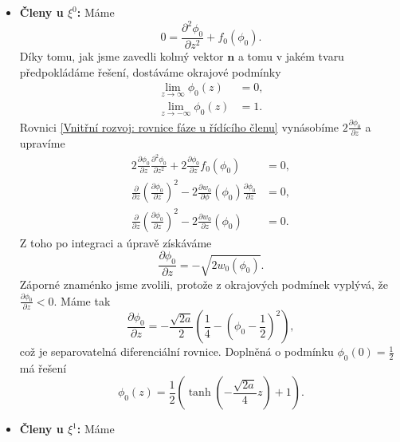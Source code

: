 \begin{itemize}
    \item \textbf{Členy u \(\xi^0\):} Máme
    \begin{equation}\label{Vnitřní rozvoj: rovnice fáze u řídícího členu}
        0 = \frac{\partial^2 \phi_0}{\partial z^2} + f_0(\phi_0).
    \end{equation}
    Díky tomu, jak jsme zavedli kolmý vektor \(\mathbf{n}\) a tomu v jakém tvaru předpokládáme řešení, dostáváme okrajové podmínky
    \begin{align}
        \lim_{z\to \infty} \phi_0(z) &= 0,\\
        \lim_{z \to -\infty} \phi_0(z) &= 1.
    \end{align}
    Rovnici \eqref{Vnitřní rozvoj: rovnice fáze u řídícího členu} vynásobíme \(2 \tfrac{\partial \phi_0}{\partial z}\) a upravíme
    \begin{align}
        2 \frac{\partial \phi_0}{\partial z} \frac{\partial^2 \phi_0}{\partial z^2} + 2 \frac{\partial \phi_0}{\partial z} f_0(\phi_0) &= 0,\\
        \frac{\partial }{\partial z}\left(\frac{\partial \phi_0}{\partial z} \right)^2 - 2\frac{\partial w_0}{\partial \phi}(\phi_0)\frac{\partial \phi_0}{\partial z} &= 0,\\
        \frac{\partial }{\partial z}\left(\frac{\partial \phi_0}{\partial z} \right)^2 - 2\frac{\partial w_0}{\partial z}(\phi_0) &= 0.
    \end{align}
    Z toho po integraci a úpravě získáváme
    \begin{equation}\label{Vnitřní rozvoj: derivace phi_0 podle z}
       \frac{\partial \phi_0}{\partial z} = - \sqrt{2w_0(\phi_0)}.
    \end{equation}
    Záporné znaménko jsme zvolili, protože z okrajových podmínek vyplývá, že \(\tfrac{\partial \phi_0}{\partial z} < 0\).
    Máme tak
    \begin{equation}
        \frac{\partial \phi_0}{\partial z} = -\frac{\sqrt{2a}}{2} \left( \frac{1}{4} - \left(\phi_0 - \frac{1}{2} \right)^2 \right),
    \end{equation}
    což je separovatelná diferenciální rovnice. Doplněná o podmínku \( \phi_0(0) = \tfrac{1}{2} \) má řešení
    \begin{equation}
        \phi_0(z) = \frac{1}{2}\left(\tanh \left( -\frac{\sqrt{2a}}{4} z \right) + 1\right).
    \end{equation}
    \item \textbf{Členy u \(\xi^1\):} Máme

\end{itemize}
